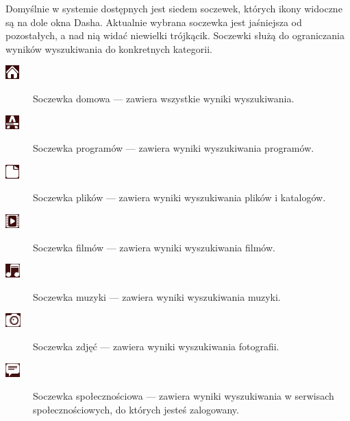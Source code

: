 Domyślnie w systemie dostępnych jest siedem soczewek, których ikony widoczne są na dole okna Dasha. Aktualnie wybrana soczewka jest jaśniejsza od pozostałych, a nad nią widać niewielki trójkącik. Soczewki służą do ograniczania wyników wyszukiwania do konkretnych kategorii.
\begin{description}
\item[\includegraphics{images/unity_dash_lens_home.png}] \textcolor{ubuntu_orange}{Soczewka domowa} --- zawiera wszystkie wyniki wyszukiwania. 
\item[\includegraphics{images/unity_dash_lens_programy.png}]\textcolor{ubuntu_orange}{Soczewka programów} --- zawiera wyniki wyszukiwania programów.
\item[\includegraphics{images/unity_dash_lens_pliki.png}] \textcolor{ubuntu_orange}{Soczewka plików} --- zawiera wyniki wyszukiwania plików i katalogów.
\item[\includegraphics{images/unity_dash_lens_video.png}] \textcolor{ubuntu_orange}{Soczewka filmów} --- zawiera wyniki wyszukiwania filmów.
\item[\includegraphics{images/unity_dash_lens_audio.png}] \textcolor{ubuntu_orange}{Soczewka muzyki} --- zawiera wyniki wyszukiwania muzyki.
\item[\includegraphics{images/unity_dash_lens_photo.png}] \textcolor{ubuntu_orange}{Soczewka zdjęć} --- zawiera wyniki wyszukiwania fotografii.
\item[\includegraphics{images/unity_dash_lens_social.png}] \textcolor{ubuntu_orange}{Soczewka społecznościowa} --- zawiera wyniki wyszukiwania w serwisach społecznościowych, do których jesteś zalogowany.
\end{description}

